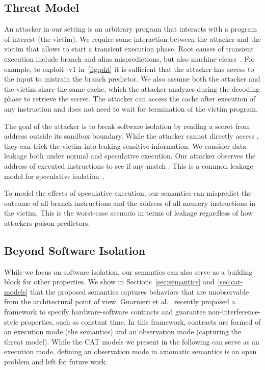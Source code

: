 \documentclass[conference]{IEEEtran}
\begin{document}
\subsection{Threat Model}
\label{sec:threatmodel}

An attacker in our setting is an arbitrary program that interacts with a program of interest (the victim).
We require some interaction between the attacker and the victim that allows to start a transient execution phase.
Root causes of transient execution include branch and alias mispredictions, but also machine clears~\cite{ragab_rage_2021}.
For example, to exploit \spectre-v1 in~\autoref{fig:pht} it is sufficient that the attacker has access to the input \varidx to mistrain the branch predictor.
We also assume both the attacker and the victim share the same cache, which the attacker analyzes during the decoding phase to retrieve the secret.
The attacker can access the cache after execution of any instruction and does not need to wait for termination of the victim program.

The goal of the attacker is to break software isolation by reading a secret from address \secret{} outside its sandbox boundary.
While the attacker cannot directly access \secret{}, they can trick the victim into leaking sensitive information.
We consider data leakage both under normal and speculative execution.
Our attacker observes the address of executed \load instructions to see if any match \secret{}.
This is a common leakage model for speculative isolation~\cite{sok:spectre}.

To model the effects of speculative execution, our semantics can mispredict the outcome of all branch instructions and the address of all memory instructions in the victim.
This is the worst-case scenario in terms of leakage regardless of how attackers poison predictors.

\subsection{Beyond Software Isolation}
\label{sec:beyond-isolation}

While we focus on software isolation, our semantics can also serve as a building block for other properties. 
We show in Sections~\ref{sec:semantics} and~\ref{sec:cat-models} that the proposed semantics captures behaviors that are unobservable from the architectural point of view.
Guarnieri et al.~\cite{speculative-contracts} recently proposed a framework to specify hardware-software contracts and guarantee non-interference-style properties, such as constant time.
In this framework, contracts are formed of an execution mode (the semantics) and an observation mode (capturing the threat model). 
While the CAT models we present in the following can serve as an execution mode, defining an observation mode in axiomatic semantics is an open problem and left for future work.
\end{document}
